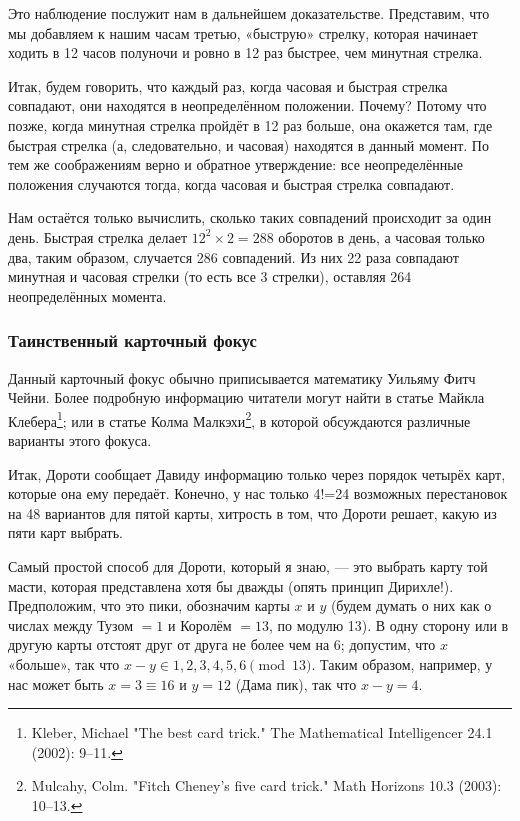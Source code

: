 Это наблюдение послужит нам в дальнейшем доказательстве.
Представим, что мы добавляем к нашим часам третью, «быструю» стрелку, которая начинает ходить в 12 часов полуночи и ровно в 12 раз быстрее, чем минутная стрелка.

Итак, будем говорить, что каждый раз, когда часовая и быстрая стрелка совпадают, они находятся в неопределённом положении.
Почему?
Потому что позже, когда минутная стрелка пройдёт в 12 раз больше, она окажется там, где быстрая стрелка (а, следовательно, и часовая) находятся в данный момент.
По тем же соображениям верно и обратное утверждение: все неопределённые положения случаются тогда, когда часовая и быстрая стрелка совпадают.

Нам остаётся только вычислить, сколько таких совпадений происходит за один день.
Быстрая стрелка делает $12^2\times 2 = 288$ оборотов в день, а часовая только два, таким образом, случается 286 совпадений.
Из них 22 раза совпадают минутная и часовая стрелки (то есть все 3 стрелки), оставляя 264 неопределённых момента. 
\heart

\subsubsection*{Таинственный карточный фокус}%

Данный карточный фокус обычно приписывается математику Уильяму Фитч Чейни. %
Более подробную информацию читатели могут найти в статье Майкла Клебера\footnote{Kleber, Michael "The best card trick." The Mathematical Intelligencer 24.1 (2002): 9--11.};
или в статье Колма Малкэхи\footnote{Mulcahy, Colm. "Fitch Cheney's five card trick." Math Horizons 10.3 (2003): 10--13.}, в которой обсуждаются различные варианты этого фокуса.

Итак, Дороти сообщает Давиду информацию только через порядок четырёх карт, которые она ему передаёт.
Конечно, у нас только 4!=24 возможных перестановок на 48 вариантов для пятой карты, хитрость в том, что Дороти решает, какую из пяти карт выбрать.

Самый простой способ для Дороти, который я знаю, --- это выбрать карту той масти, которая представлена хотя бы дважды (опять принцип Дирихле!).
Предположим, что это пики, обозначим карты $x$ и $y$ (будем думать о них как о числах между Тузом $= 1$ и Королём $= 13$, по модулю 13).
В одну сторону или в другую карты отстоят друг от друга не более чем на 6;
допустим, что $x$ «больше», так что $x-y\in {1,2,3,4,5,6} \pmod{13}$.
Таким образом, например, у нас может быть $x =3\equiv 16$ и $y = 12$ (Дама пик), так что $x - y = 4$.

